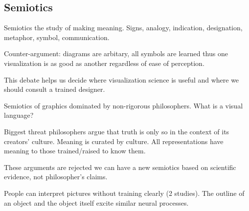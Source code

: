 \begin{mdframed}\begin{multicols}{2}
\subsection{Semiotics}

\begin{compactdesc}
\item[Semiotics] the study of making meaning. Signs, analogy, indication,
    designation, metaphor, symbol, communication.
\item[Counter-argument:] diagrams are arbitary, all symbols are learned thus
    one visualization is as good as another regardless of ease of perception.
\item[This debate] helps us decide where visualization science is useful and
    where we should consult a trained designer.
\item[Semiotics of graphics] dominated by non-rigorous philosophers. What is a
    visual language?
\item[Biggest threat] philosophers argue that truth is only so in the context
    of its creators' culture. Meaning is curated by culture. All representations
    have meaning to those trained/raised to know them.
\item[These arguments are rejected] we can have a new semiotics based on
    scientific evidence, not philosopher's claims.
\item[People can interpret] pictures without training clearly (2 studies). The
    outline of an object and the object itself excite similar neural processes.
\end{compactdesc}
\end{multicols}\end{mdframed}




